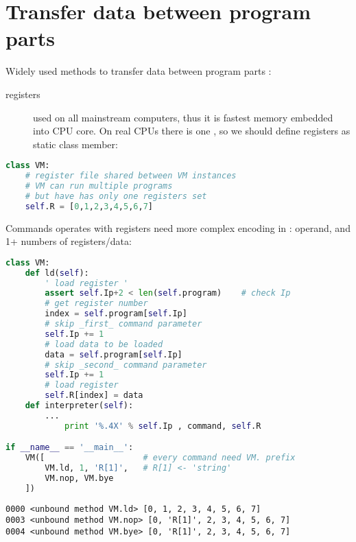 \section{Transfer data between program parts}

Widely used methods to transfer data between program parts :
\begin{description}
\item[registers] used on all mainstream computers, thus it is fastest memory
embedded into CPU core. On real CPUs there is one
\href{https://en.wikipedia.org/wiki/Register_file}{}, so we
should define registers as static class member:
\end{description}

\begin{lstlisting}[language=python]
class VM:
	# register file shared between VM instances
	# VM can run multiple programs
	# but have has only one registers set 
	self.R = [0,1,2,3,4,5,6,7]  
\end{lstlisting}

Commands operates with registers need more complex encoding in : operand, and 1+ numbers of registers/data:

\begin{lstlisting}[language=python]
class VM:
    def ld(self):
        ' load register '
        assert self.Ip+2 < len(self.program)	# check Ip
        # get register number
        index = self.program[self.Ip]
        # skip _first_ command parameter
        self.Ip += 1                 
        # load data to be loaded
        data = self.program[self.Ip] 
        # skip _second_ command parameter
        self.Ip += 1                 
        # load register
        self.R[index] = data         
    def interpreter(self):
        ...
            print '%.4X' % self.Ip , command, self.R

if __name__ == '__main__':
    VM([                    # every command need VM. prefix
        VM.ld, 1, 'R[1]',   # R[1] <- 'string'
        VM.nop, VM.bye
    ])
\end{lstlisting}
\begin{lstlisting}
0000 <unbound method VM.ld> [0, 1, 2, 3, 4, 5, 6, 7]
0003 <unbound method VM.nop> [0, 'R[1]', 2, 3, 4, 5, 6, 7]
0004 <unbound method VM.bye> [0, 'R[1]', 2, 3, 4, 5, 6, 7]
\end{lstlisting}

